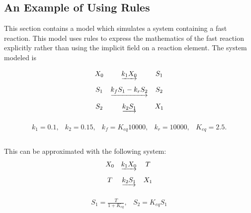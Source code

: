 \documentclass[10pt]{cekarticle}
\newcommand{\D}{\displaystyle}
\newcommand{\changed}[1]{\textcolor{BrickRed}{#1}}
\newenvironment{blockChanged}{\color{BrickRed}}{}
\begin{document}
\subsection{\changed{An Example of Using Rules}}
\label{subsection:ruleseg}

\begin{blockChanged}
This section contains a model which simulates a system containing
a fast reaction. This model uses rules to express the mathematics
of the fast reaction explicitly rather than using the implicit
 field on a reaction element.  The system modeled is

\begin{equation*}
  \begin{array}{@{}ccc@{}}
    X_0 & \underrightarrow{k_1 X_0} & S_1 \\ \\[-4pt]
    S_1 & \underrightarrow{k_f S_1 - k_r S_2} & S_2 \\ \\[-4pt]
    S_2 & \underrightarrow{k_2 S_1} & X_1\\ \\[-4pt]
  \end{array}
\end{equation*}
\begin{equation*}
  \begin{array}{lllll}
    k_1 = 0.1, & k_2 = 0.15, & k_f = K_{eq} 10000, & k_r = 10000, & K_{eq}
    = 2.5.\\ \\[-4pt]
  \end{array}
\end{equation*}

This can be approximated with the following system:
\begin{equation*}
  \begin{array}{@{}ccc@{}}
    X_0 & \underrightarrow{k_1 X_0} & T \\ \\[-4pt]
    T & \underrightarrow{k_2 S_1} & X_1\\ \\[-4pt]
  \end{array}
\end{equation*}
\begin{equation*}
  \begin{array}{ll}
    S_1 = \D\frac{T}{1 + K_{eq}}, & S_2 = K_{eq} S_1\\ \\[-4pt]
  \end{array}
\end{equation*}


\end{blockChanged}
\end{document}

